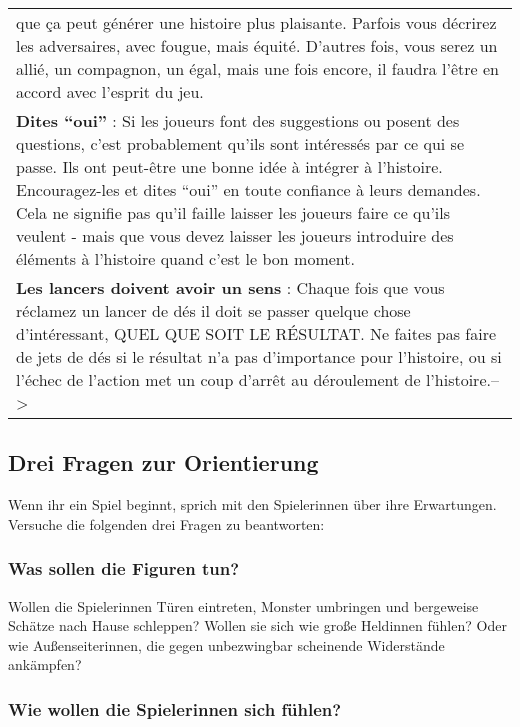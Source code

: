 \documentclass[]{article}
\begin{document}
\begin{longtable}[]{@{}l@{}}
\begin{minipage}[t]{0.05\columnwidth}
que ça peut générer une histoire plus plaisante. Parfois vous décrirez
les adversaires, avec fougue, mais équité. D'autres fois, vous serez un
allié, un compagnon, un égal, mais une fois encore, il faudra l'être en
accord avec l'esprit du jeu.
\strut\end{minipage}\tabularnewline
\begin{minipage}[t]{0.05\columnwidth}\raggedright\strut
\textbf{Dites ``oui''} : Si les joueurs font des suggestions ou posent
des questions, c'est probablement qu'ils sont intéressés par ce qui se
passe. Ils ont peut-être une bonne idée à intégrer à l'histoire.
Encouragez-les et dites ``oui'' en toute confiance à leurs demandes.
Cela ne signifie pas qu'il faille laisser les joueurs faire ce qu'ils
veulent - mais que vous devez laisser les joueurs introduire des
éléments à l'histoire quand c'est le bon moment.
\strut\end{minipage}\tabularnewline
\begin{minipage}[t]{0.05\columnwidth}\raggedright\strut
\textbf{Les lancers doivent avoir un sens} : Chaque fois que vous
réclamez un lancer de dés il doit se passer quelque chose d'intéressant,
QUEL QUE SOIT LE RÉSULTAT. Ne faites pas faire de jets de dés si le
résultat n'a pas d'importance pour l'histoire, ou si l'échec de l'action
met un coup d'arrêt au déroulement de l'histoire.--\textgreater{}
\strut\end{minipage}\tabularnewline
\bottomrule
\end{longtable}

\subsection{Drei Fragen zur
Orientierung}\label{drei-fragen-zur-orientierung}

Wenn ihr ein Spiel beginnt, sprich mit den Spielerinnen über ihre
Erwartungen. Versuche die folgenden drei Fragen zu beantworten:

\subsubsection{Was sollen die Figuren
tun?}\label{was-sollen-die-figuren-tun}

Wollen die Spielerinnen Türen eintreten, Monster umbringen und
bergeweise Schätze nach Hause schleppen? Wollen sie sich wie große
Heldinnen fühlen? Oder wie Außenseiterinnen, die gegen unbezwingbar
scheinende Widerstände ankämpfen?

\subsubsection{Wie wollen die Spielerinnen sich
fühlen?}\label{wie-wollen-die-spielerinnen-sich-fuxfchlen}
\end{document}
